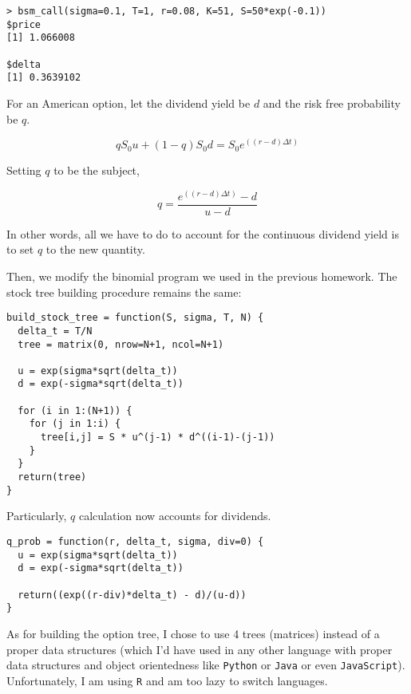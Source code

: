 \documentclass[11pt]{scrartcl}
\newcommand{\epower}[1]{\ensuremath{e^{\left(#1\right)}}}
\begin{document}
\begin{lstlisting}
> bsm_call(sigma=0.1, T=1, r=0.08, K=51, S=50*exp(-0.1))
$price
[1] 1.066008

$delta
[1] 0.3639102
\end{lstlisting}

For an American option, let the dividend yield be $d$ and the risk free probability be $q$.

\[qS_0u + (1-q)S_0d = S_0\epower{(r-d)\Delta t}\]

Setting $q$ to be the subject,

\[q = \frac{\epower{(r-d)\Delta t} - d}{u-d}\]

In other words, all we have to do to account for the continuous dividend yield is to set $q$ to the new quantity.

Then, we modify the binomial program we used in the previous homework. The stock tree building procedure remains the same:

\begin{lstlisting}
build_stock_tree = function(S, sigma, T, N) {
  delta_t = T/N
  tree = matrix(0, nrow=N+1, ncol=N+1)
  
  u = exp(sigma*sqrt(delta_t))
  d = exp(-sigma*sqrt(delta_t))
  
  for (i in 1:(N+1)) {
    for (j in 1:i) {
      tree[i,j] = S * u^(j-1) * d^((i-1)-(j-1))
    }
  }
  return(tree)
}
\end{lstlisting}

Particularly, $q$ calculation now accounts for dividends.

\begin{lstlisting}
q_prob = function(r, delta_t, sigma, div=0) {
  u = exp(sigma*sqrt(delta_t))
  d = exp(-sigma*sqrt(delta_t))
  
  return((exp((r-div)*delta_t) - d)/(u-d))
}
\end{lstlisting}

As for building the option tree, I chose to use 4 trees (matrices) instead of a proper data structures (which I'd have used in any other language with proper data structures and object orientedness like \texttt{Python} or \texttt{Java} or even \texttt{JavaScript}). Unfortunately, I am using \texttt{R} and am too lazy to switch languages.
\end{document}

